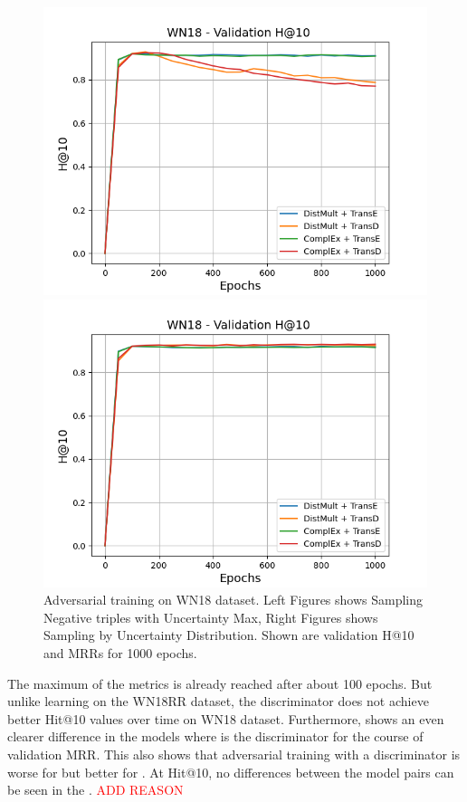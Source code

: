 \begin{figure}
\begin{minipage}{.5\textwidth}
    \end{minipage}
    \begin{minipage}{.5\textwidth}
      \centering
      \includegraphics[width=0.9\linewidth]{figures/results/gan_train/not_pretrained/uncertainty/max/entropy/wn18/uncertainty_wn18_hit10.png}
    \end{minipage}%
    \begin{minipage}{.5\textwidth}
      \centering
      \includegraphics[width=0.9\linewidth]{figures/results/gan_train/not_pretrained/uncertainty/max_distribution/entropy/wn18/uncertainty_wn18_hit10.png}
    \end{minipage}%
    \caption{Adversarial training on \textsc{WN18} dataset. 
    Left Figures shows Sampling Negative triples with Uncertainty Max, Right Figures shows Sampling by Uncertainty Distribution.
    Shown are validation H@10 and MRRs for 1000 epochs.}
    \label{fig:advtrain_wn18_usmax_ussoftmax}
\end{figure}
The maximum of the metrics is already reached after about 100 epochs.
But unlike learning on the \textsc{WN18RR} dataset, the discriminator does not achieve better Hit@10 values over time on \textsc{WN18} dataset.
Furthermore, \ussoftmax shows an even clearer difference in the models where \transd is the discriminator for the course of validation MRR.
This also shows that adversarial training with a \transd discriminator is worse for \usmax but better for \ussoftmax.
At Hit@10, no differences between the model pairs can be seen in the \ussoftmax.
\textcolor{red}{ADD REASON}

